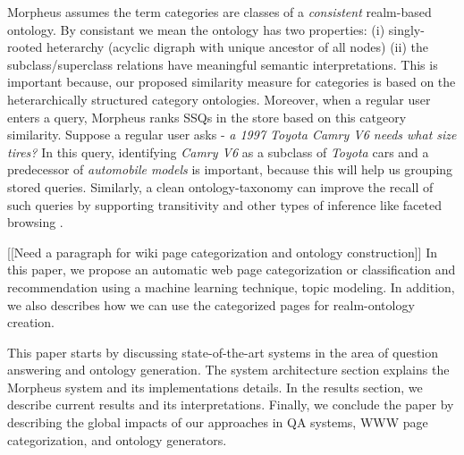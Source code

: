 Morpheus assumes the term categories are classes of a
\textit{consistent} realm-based ontology. By consistant we mean the ontology has two
properties: (i) singly-rooted heterarchy (acyclic digraph with unique 
ancestor of all nodes) (ii) the subclass/superclass relations have meaningful 
semantic interpretations. This is important because, our proposed similarity 
measure for categories is based on the heterarchically
structured category ontologies. Moreover, when a regular user enters a query,
Morpheus ranks SSQs in the store based on this catgeory similarity. Suppose a
regular user asks -\textit{ a 1997 Toyota Camry V6 needs what size tires?} In
this query, identifying \textit{Camry V6} as a subclass of \textit{Toyota} cars
and a predecessor of \textit{automobile models} is important, because this will
help us grouping stored queries. Similarly, a clean ontology-taxonomy can
improve the recall of such queries by supporting transitivity and other types of
inference like faceted browsing \cite{Wu2008}.   

[[Need a paragraph for wiki page categorization and ontology construction]]
In this paper, we propose an automatic web page categorization or 
classification and recommendation using a machine learning technique, topic modeling.
In addition, we also describes how we can use the categorized pages for realm-ontology 
creation.   

This paper starts by discussing state-of-the-art systems in the area of
question answering and ontology generation. The system
architecture section explains the Morpheus system and its implementations
details. In the results section, we describe current results and its
interpretations. Finally, we conclude the paper by describing the global impacts
of our approaches in QA systems, WWW page categorization, and ontology
generators.
